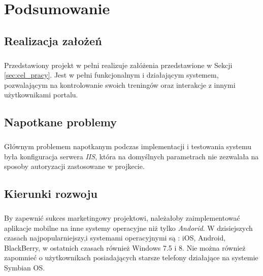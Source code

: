 \chapter{Podsumowanie} %
\label{cha:podsumowanie}

\section{Realizacja założeń} %
\label{sec:realizacja_za_o_e_}
\paragraph{} %
\label{par:}

Przedstawiony projekt w pełni realizuje załóżenia przedstawione w Sekcji \ref{sec:cel_pracy}. Jest w pełni funkcjonalnym i działającym systemem, pozwalającym na kontrolowanie swoich treningów oraz interakcje z innymi użytkownikami portalu.

\section{Napotkane problemy} %
\label{sec:napotkane_problemy}
\paragraph{} %
\label{par:}
Głównym problemem napotkanym podczas implementacji i testowania systemu była konfiguracja serwera \textit{IIS}, która na domyślnych parametrach nie zezwalała na sposoby autoryzacji zastosowane w projkecie.


\section{Kierunki rozwoju} %
\label{sec:kierunki_rozwoju}

\paragraph{} %
\label{par:}
By zapewnić sukces marketingowy projektowi, należałoby zaimplementować aplikacje mobilne na inne systemy operacyjne niż tylko \textit{Andorid}. W dzisiejszych czasach najpopularniejszy,i systemami operacyjnymi są : iOS, Android, BlackBerry, w ostatnich czasach również Windows 7.5 i 8. Nie można również zapomnieć o użytkownikach posiadających starsze telefony działające na systemie Symbian OS.

